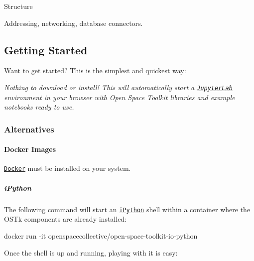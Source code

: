 Structure

\href{https://github.com/open-space-collective/open-space-toolkit-io/actions/workflows/build-test.yml}{\tt } \href{https://codecov.io/gh/open-space-collective/open-space-toolkit-io}{\tt } \href{https://open-space-collective.github.io/open-space-toolkit-io}{\tt } \href{https://badge.fury.io/gh/open-space-collective%2Fopen-space-toolkit-io}{\tt } \href{https://badge.fury.io/py/open-space-toolkit-io}{\tt } \href{https://opensource.org/licenses/Apache-2.0}{\tt }

Addressing, networking, database connectors.

\subsection*{Getting Started}

Want to get started? This is the simplest and quickest way\+:

\href{https://mybinder.org/v2/gh/open-space-collective/open-space-toolkit/main?urlpath=lab/tree/notebooks}{\tt }

{\itshape Nothing to download or install! This will automatically start a \href{https://jupyterlab.readthedocs.io/en/stable/}{\tt Jupyter\+Lab} environment in your browser with Open Space Toolkit libraries and example notebooks ready to use.}

\subsubsection*{Alternatives}

\paragraph*{Docker Images}

\href{https://www.docker.com/}{\tt Docker} must be installed on your system.

\subparagraph*{i\+Python}

The following command will start an \href{https://ipython.org/}{\tt i\+Python} shell within a container where the O\+S\+Tk components are already installed\+:


\begin{DoxyCode}
docker run -it openspacecollective/open-space-toolkit-io-python
\end{DoxyCode}


Once the shell is up and running, playing with it is easy\+:


